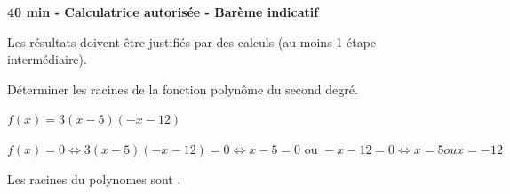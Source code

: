 \documentclass[12pt,a4paper]{article}  %
\begin{document}
\begin{center}

\end{center}


\begin{center}\textbf{40 min - Calculatrice autorisée - Barème indicatif}\end{center}


\begin{center}
Les résultats doivent être justifiés par des calculs (au moins 1 étape intermédiaire).
\end{center}
\vspace{.05cm} 


Déterminer les racines de la fonction polynôme du second degré.
\begin{enumMet}
    \item $f(x)=3(x-5)(-x-12)$
\end{enumMet}
\begin{corrBox}
	$f(x)=0\iff 3(x-5)(-x-12)=0\iff x-5=0 \text{ ou } -x-12=0\iff x=5 ou x=-12$
	
	Les racines du polynomes sont .
\end{corrBox}

\vspace{-0.3cm}
\end{document}
